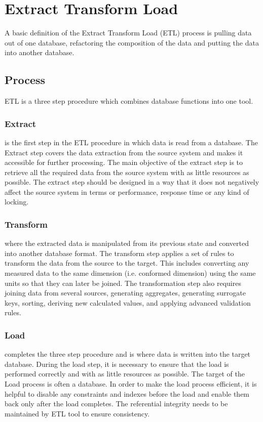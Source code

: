 \section{Extract Transform Load}\label{etl}
A basic definition of the Extract Transform Load (ETL) process is pulling data out of one database, refactoring the composition of the data and putting the data into another database. 

\subsection{Process}
ETL is a three step procedure which combines database functions into one tool.
\subsubsection{Extract} is the first step in the ETL procedure in which data is read from a database. The Extract step covers the data extraction from the source system and makes it accessible for further processing. The main objective of the extract step is to retrieve all the required data from the source system with as little resources as possible. The extract step should be designed in a way that it does not negatively affect the source system in terms or performance, response time or any kind of locking.
\subsubsection{Transform} where the extracted data is manipulated from its previous state and converted into another database format. The transform step applies a set of rules to transform the data from the source to the target. This includes converting any measured data to the same dimension (i.e. conformed dimension) using the same units so that they can later be joined. The transformation step also requires joining data from several sources, generating aggregates, generating surrogate keys, sorting, deriving new calculated values, and applying advanced validation rules.
\subsubsection{Load} completes the three step procedure and is where data is written into the target database. During the load step, it is necessary to ensure that the load is performed correctly and with as little resources as possible. The target of the Load process is often a database. In order to make the load process efficient, it is helpful to disable any constraints and indexes before the load and enable them back only after the load completes. The referential integrity needs to be maintained by ETL tool to ensure consistency.
